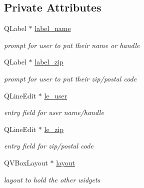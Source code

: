 \subsection*{Private Attributes}
\begin{CompactItemize}
\item 
\hypertarget{classUserSettingsWizardPage_2a541820915f8887a5c4d433e2f705b0}{
QLabel $\ast$ \hyperlink{classUserSettingsWizardPage_2a541820915f8887a5c4d433e2f705b0}{label\_\-name}}
\label{classUserSettingsWizardPage_2a541820915f8887a5c4d433e2f705b0}

\begin{CompactList}\small\item\em prompt for user to put their name or handle \item\end{CompactList}\item 
\hypertarget{classUserSettingsWizardPage_eeea1ada36d70e49fe39b82c06a89b0c}{
QLabel $\ast$ \hyperlink{classUserSettingsWizardPage_eeea1ada36d70e49fe39b82c06a89b0c}{label\_\-zip}}
\label{classUserSettingsWizardPage_eeea1ada36d70e49fe39b82c06a89b0c}

\begin{CompactList}\small\item\em prompt for user to put their zip/postal code \item\end{CompactList}\item 
\hypertarget{classUserSettingsWizardPage_f8d85eea54b294aa96e158029c45d236}{
QLineEdit $\ast$ \hyperlink{classUserSettingsWizardPage_f8d85eea54b294aa96e158029c45d236}{le\_\-user}}
\label{classUserSettingsWizardPage_f8d85eea54b294aa96e158029c45d236}

\begin{CompactList}\small\item\em entry field for user name/handle \item\end{CompactList}\item 
\hypertarget{classUserSettingsWizardPage_a988b644edf9e64d42b270438a209d45}{
QLineEdit $\ast$ \hyperlink{classUserSettingsWizardPage_a988b644edf9e64d42b270438a209d45}{le\_\-zip}}
\label{classUserSettingsWizardPage_a988b644edf9e64d42b270438a209d45}

\begin{CompactList}\small\item\em entry field for zip/postal code \item\end{CompactList}\item 
\hypertarget{classUserSettingsWizardPage_476d47d25ff28023db65310df178f57b}{
QVBoxLayout $\ast$ \hyperlink{classUserSettingsWizardPage_476d47d25ff28023db65310df178f57b}{layout}}
\label{classUserSettingsWizardPage_476d47d25ff28023db65310df178f57b}

\begin{CompactList}\small\item\em layout to hold the other widgets \item\end{CompactList}\end{CompactItemize}


